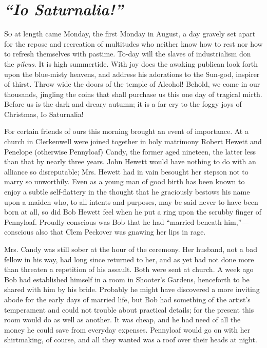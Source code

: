 \chapter{\emph{``Io Saturnalia!''}}

\textsc{So} at length came Monday, the first Monday in August, a day
gravely set apart for the repose and recreation of multitudes who
neither know how to rest nor how to refresh themselves with pastime.
To-day will the slaves of industrialism don the \emph{pileus}. It is
high summertide. With joy does the awaking publican look forth upon the
blue-misty heavens, and address his adorations to the Sun-god, inspirer
of thirst. Throw wide the doors of the temple of Alcohol! Behold, we
come in our thousands, jingling the coins that shall purchase us this
one day of tragical mirth. Before us is the dark and dreary autumn; it
is a far cry to the foggy joys of Christmas, Io Saturnalia!

For certain friends of ours this morning {}brought an event of
importance. At a church in Clerkenwell were joined together in holy
matrimony Robert Hewett and Penelope (otherwise Pennyloaf) Candy, the
former aged nineteen, the latter less than that by nearly three years.
John Hewett would have nothing to do with an alliance so disreputable;
Mrs. Hewett had in vain besought her stepson not to marry so unworthily.
Even as a young man of good birth has been known to enjoy a subtle
self-flattery in the thought that he graciously bestows his name upon a
maiden who, to all intents and purposes, may be said never to have been
born at all, so did Bob Hewett feel when he put a ring upon the scrubby
finger of Pennyloaf. Proudly conscious was Bob that he had ``married
beneath him,''---conscious also that Clem Peckover was gnawing her lips
in rage.

Mrs. Candy was still sober at the hour of the ceremony. Her husband, not
a bad fellow in his way, had long since returned to her, and as yet had
not done more than threaten a repetition of his assault. Both were
{}sent at church. A week ago Bob had established himself in a room in
Shooter's Gardens, henceforth to be shared with him by his bride.
Probably he might have discovered a more inviting abode for the early
days of married life, but Bob had something of the artist's temperament
and could not trouble about practical details; for the present this room
would do as well as another. It was cheap, and he had need of all the
money he could save from everyday expenses. Pennyloaf would go on with
her shirtmaking, of course, and all they wanted was a roof over their
heads at night.

